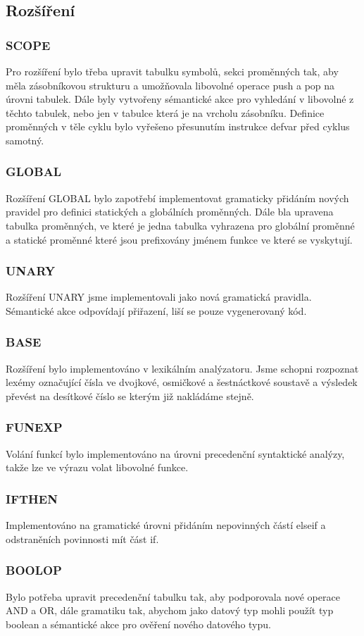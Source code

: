 \subsection{Rozšíření}

\subsubsection{SCOPE}
Pro rozšíření bylo třeba upravit tabulku symbolů, sekci proměnných tak, aby
měla zásobníkovou strukturu a umožňovala libovolné operace push a pop na úrovni tabulek.
Dále byly vytvořeny sémantické akce pro vyhledání v libovolné z těchto tabulek,
nebo jen v tabulce která je na vrcholu zásobníku. Definice proměnných v těle cyklu
bylo vyřešeno přesunutím instrukce defvar před cyklus samotný.
\subsubsection{GLOBAL}
Rozšíření GLOBAL bylo zapotřebí implementovat gramaticky přidáním
nových pravidel pro definici statických a globálních proměnných.
Dále bla upravena tabulka proměnných, ve které je jedna tabulka vyhrazena
pro globální proměnné a statické proměnné které jsou prefixovány
jménem funkce ve které se vyskytují.
\subsubsection{UNARY}
Rozšíření UNARY jsme implementovali jako nová gramatická pravidla. Sémantické
akce odpovídají přiřazení, liší se pouze vygenerovaný kód.
\subsubsection{BASE}
Rozšíření bylo implementováno v lexikálním analýzatoru. Jsme schopni rozpoznat
lexémy označující čísla ve dvojkové, osmičkové a šestnáctkové soustavě a
výsledek převést na desítkové číslo se kterým již nakládáme stejně.
\subsubsection{FUNEXP}
Volání funkcí bylo implementováno na úrovni precedenční syntaktické analýzy,
takže lze ve výrazu volat libovolné funkce.
\subsubsection{IFTHEN}
Implementováno na gramatické úrovni přidáním nepovinných částí
elseif a odstraněních povinnosti mít část if.
\subsubsection{BOOLOP}
Bylo potřeba upravit precedenční tabulku tak, aby podporovala nové
operace AND a OR, dále gramatiku tak, abychom jako datový typ mohli
použít typ boolean a sémantické akce pro ověření nového datového typu.